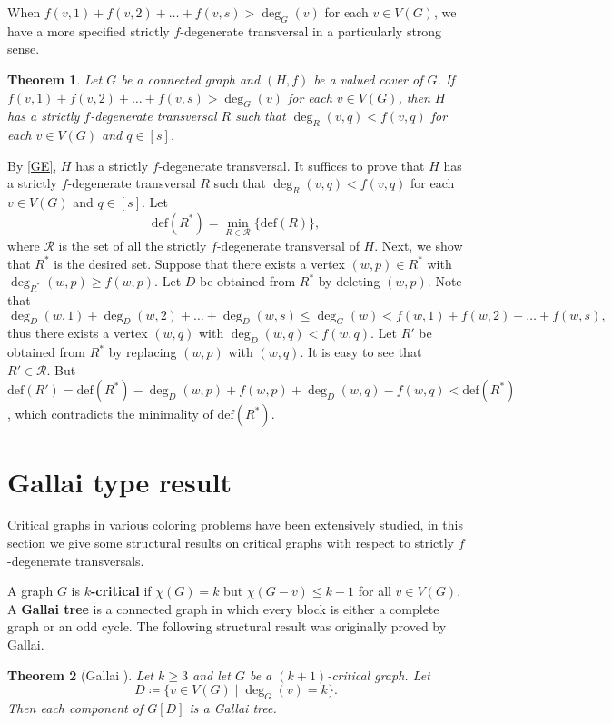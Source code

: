 \documentclass{article}
\makeatletter
\renewenvironment{proof}[1][\proofname]{\par
  \pushQED{\qed}%
  \normalfont \topsep6\p@\@plus6\p@\relax
  \trivlist
  \item[\hskip\labelsep
        \bfseries
    #1\@addpunct{.}]\ignorespaces
}{%
  \popQED\endtrivlist\@endpefalse
}
\newtheorem{theorem}{Theorem}[section]
\theoremstyle{definition}
\makeatother
\begin{document}
When $f(v, 1) + f(v, 2) + \dots + f(v, s) > \deg_{G}(v)$ for each $v \in V(G)$, we have a more specified strictly $f$-degenerate transversal in a particularly strong sense. 
\begin{theorem}\label{MSMR}
Let $G$ be a connected graph and $(H, f)$ be a valued cover of $G$. If $f(v, 1) + f(v, 2) + \dots + f(v, s) > \deg_{G}(v)$ for each $v \in V(G)$, then $H$ has a strictly $f$-degenerate transversal $R$ such that $\deg_{R}(v, q) < f(v, q)$ for each $v \in V(G)$ and $q \in [s]$. 
\end{theorem}
\begin{proof}
By \autoref{GE}, $H$ has a strictly $f$-degenerate transversal. It suffices to prove that $H$ has a strictly $f$-degenerate transversal $R$ such that $\deg_{R}(v, q) < f(v, q)$ for each $v \in V(G)$ and $q \in [s]$. Let 
\begin{equation*}
\mathrm{def}(R^{*}) = \min_{R \in \mathcal{R}} \big\{\mathrm{def}(R) \big\}, 
\end{equation*}
where $\mathcal{R}$ is the set of all the strictly $f$-degenerate transversal of $H$. Next, we show that $R^{*}$ is the desired set. Suppose that there exists a vertex $(w, p) \in R^{*}$ with $\deg_{R^{*}}(w, p) \geq f(w, p)$. Let $D$ be obtained from $R^{*}$ by deleting $(w, p)$. Note that 
\begin{equation*}
\deg_{D}(w, 1) + \deg_{D}(w, 2) + \dots + \deg_{D}(w, s) \leq \deg_{G}(w) < f(w, 1) + f(w, 2) + \dots + f(w, s), 
\end{equation*}
thus there exists a vertex $(w, q)$ with $\deg_{D}(w, q) < f(w, q)$. Let $R'$ be obtained from $R^{*}$ by replacing $(w, p)$ with $(w, q)$. It is easy to see that $R' \in \mathcal{R}$. But $\mathrm{def}(R') = \mathrm{def}(R^{*}) - \deg_{D}(w, p) + f(w, p) + \deg_{D}(w, q)  - f(w, q) < \mathrm{def}(R^{*})$, which contradicts the minimality of $\mathrm{def}(R^{*})$. 
\end{proof}

\section{Gallai type result}\label{sec:MINIMAL}
Critical graphs in various coloring problems have been extensively studied, in this section we give some structural results on critical graphs with respect to strictly $f$-degenerate transversals. 

A graph $G$ is \textbf{$k$-critical} if $\chi(G) = k$ but $\chi(G - v) \leq k - 1$ for all $v \in V(G)$. A \textbf{Gallai tree} is a connected graph in which every block is either a complete graph or an odd cycle. The following structural result was originally proved by Gallai. 
\begin{theorem}[Gallai \cite{MR0188099}]\label{Critical-1}
Let $k \geq 3$ and let $G$ be a $(k + 1)$-critical graph. Let 
\begin{equation*}
D \coloneqq \{v \in V(G) \mid \deg_{G}(v) = k\}.
\end{equation*}
Then each component of $G[D]$ is a Gallai tree. 
\end{theorem}
\end{document}
